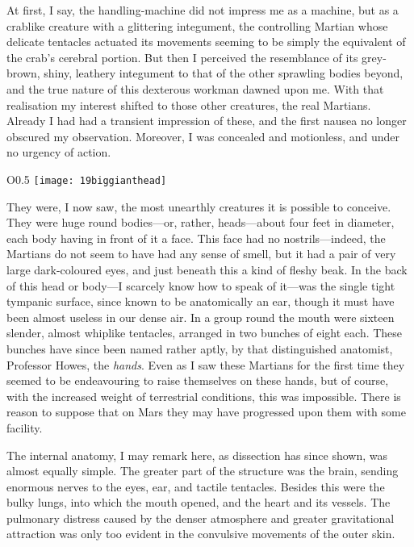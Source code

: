 At first, I say, the handling-machine did not impress me as a machine, but as a crablike creature with a glittering integument, the controlling Martian whose delicate tentacles actuated its movements seeming to be simply the equivalent of the crab's cerebral portion. But then I perceived the resemblance of its grey-brown, shiny, leathery integument to that of the other sprawling bodies beyond, and the true nature of this dexterous workman dawned upon me. With that realisation my interest shifted to those other creatures, the real Martians. Already I had had a transient impression of these, and the first nausea no longer obscured my observation. Moreover, I was concealed and motionless, and under no urgency of action.


\begin{wrapfigure}{O}{0.5\textwidth}
\centering
\texttt{[image: 19biggianthead]}
\end{wrapfigure}

They were, I now saw, the most unearthly creatures it is possible to conceive. They were huge round bodies—or, rather, heads—about four feet in diameter, each body having in front of it a face. This face had no nostrils—indeed, the Martians do not seem to have had any sense of smell, but it had a pair of very large dark-coloured eyes, and just beneath this a kind of fleshy beak. In the back of this head or body—I scarcely know how to speak of it—was the single tight tympanic surface, since known to be anatomically an ear, though it must have been almost useless in our dense air. In a group round the mouth were sixteen slender, almost whiplike tentacles, arranged in two bunches of eight each. These bunches have since been named rather aptly, by that distinguished anatomist, Professor Howes, the \textit{hands}. Even as I saw these Martians for the first time they seemed to be endeavouring to raise themselves on these hands, but of course, with the increased weight of terrestrial conditions, this was impossible. There is reason to suppose that on Mars they may have progressed upon them with some facility.

The internal anatomy, I may remark here, as dissection has since shown, was almost equally simple. The greater part of the structure was the brain, sending enormous nerves to the eyes, ear, and tactile tentacles. Besides this were the bulky lungs, into which the mouth opened, and the heart and its vessels. The pulmonary distress caused by the denser atmosphere and greater gravitational attraction was only too evident in the convulsive movements of the outer skin.

